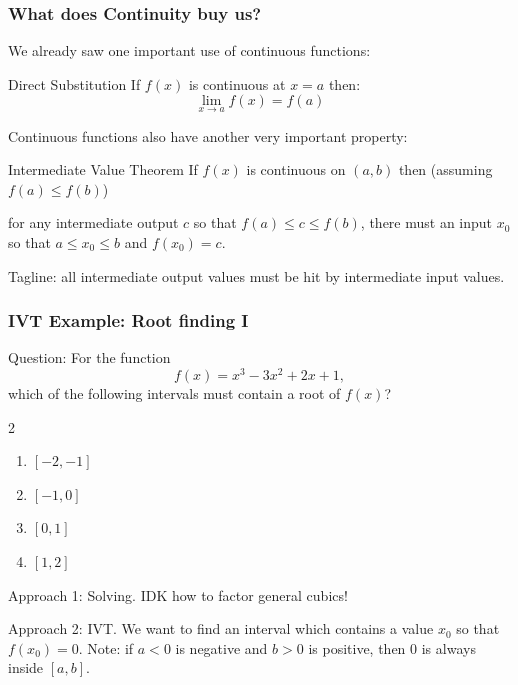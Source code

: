 \documentclass{ltx-talk}
\begin{document}
\begin{frame}
  \frametitle{What does Continuity buy us?}

  We already saw one important use of continuous functions: \pause

  \begin{alertblock}{Direct Substitution}
    If $f(x)$ is continuous at $x = a$ then:
    \begin{equation}
      \lim_{x \rightarrow a} f(x) = f(a)
    \end{equation} \pause
  \end{alertblock}

  Continuous functions also have another very important property: \pause

  \begin{alertblock}{Intermediate Value Theorem}
    If $f(x)$ is continuous on $(a,b)$ then \pause
    (assuming $f(a) \leq f(b)$) \pause 

    for any intermediate output $c$ so that $f(a) \leq c \leq f(b)$, there must an input $x_0$ so that $a \leq x_0 \leq b$ and $f(x_0) = c$.
  \end{alertblock} \pause

  Tagline: all intermediate output values must be hit by intermediate input values.
\end{frame}

\begin{frame}
  \frametitle{IVT Example: Root finding I}
  Question: For the function
  \begin{equation}
    f(x) = x^3 - 3x^2 + 2x + 1,
  \end{equation}
  which of the following intervals must contain a root of $f(x)$?
  \begin{multicols}{2}
    \begin{enumerate}
      \item $[-2, -1]$
      \item $[-1, 0]$
      \item $[0, 1]$
      \item $[1, 2]$
    \end{enumerate}
  \end{multicols} \pause

  \vspace{.4in}
  Approach 1: Solving. \pause IDK how to factor general cubics! \pause

  Approach 2: IVT. \pause We want to find an interval which contains a value $x_0$ so that $f(x_0) = 0$. \pause Note: if $a < 0$ is negative and $b > 0$ is positive, \pause then $0$ is always inside $[a, b]$. \pause
\end{frame}
\end{document}
